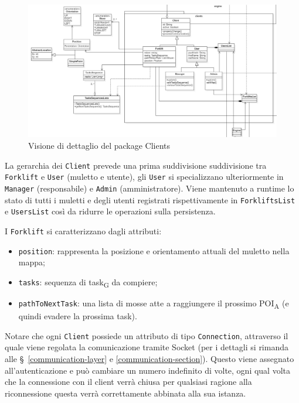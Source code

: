 \begin{figure}[H]
	\centering
	\includegraphics[scale=0.40]{res/diagrams/server/server_pack_clients.jpg}
	\caption{Visione di dettaglio del package Clients}
\end{figure}

La gerarchia dei \texttt{Client} prevede una prima suddivisione suddivisione tra \texttt{Forklift} e \texttt{User} (muletto e utente), gli \texttt{User} si specializzano ulteriormente in \texttt{Manager} (responsabile) e \texttt{Admin} (amministratore). Viene mantenuto a runtime lo stato di tutti i muletti e degli utenti registrati rispettivamente in \texttt{ForkliftsList} e \texttt{UsersList} così da ridurre le operazioni sulla persistenza.

I \texttt{Forklift} si caratterizzano dagli attributi:
\begin{itemize}
	\item \texttt{position}: rappresenta la posizione e orientamento attuali del muletto nella mappa;
	\item \texttt{tasks}: sequenza di task\textsubscript{G} da compiere;
	\item \texttt{pathToNextTask}: una lista di mosse atte a raggiungere il prossimo POI\textsubscript{A} (e quindi evadere la prossima task).
\end{itemize}

Notare che ogni \texttt{Client} possiede un attributo di tipo \texttt{Connection}, attraverso il quale viene regolata la comunicazione tramite Socket (per i dettagli si rimanda alle \S\ \ref{communication-layer} e \ref{communication-section}). Questo viene assegnato all'autenticazione e può cambiare un numero indefinito di volte, ogni qual volta che la connessione con il client verrà chiusa per qualsiasi ragione alla riconnessione questa verrà correttamente abbinata alla sua istanza.\\

